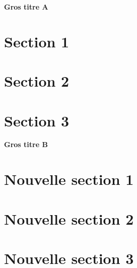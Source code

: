\documentclass{beamer}
\begin{document}
\begin{frame}
\begin{center}
    {\large \textbf{Gros titre A}}
\end{center}
\end{frame}

\section{Section 1}
\section{Section 2}
\section{Section 3}

\makeatletter
{}
\makeatother
\begin{frame}
\begin{center}
    {\large \textbf{Gros titre B}}
\end{center}
\end{frame}

\section{Nouvelle section 1}
\section{Nouvelle section 2}
\section{Nouvelle section 3}
\end{document}
